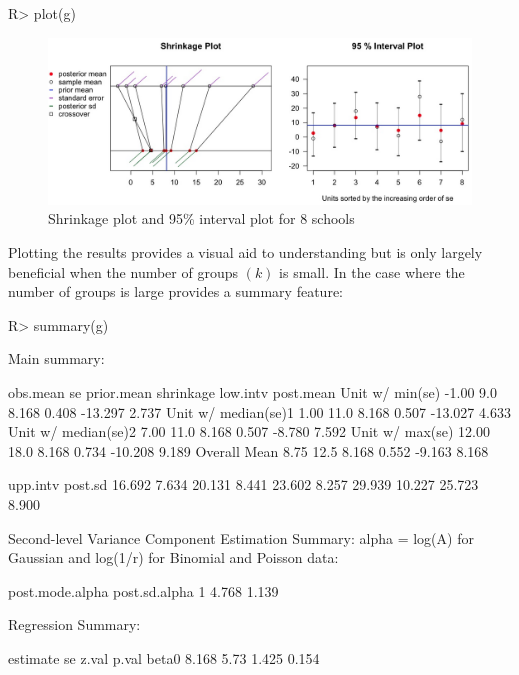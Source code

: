 \documentclass[article]{jss}
\begin{document}
\begin{CodeChunk}
\begin{CodeInput}
R> plot(g)
\end{CodeInput}
\end{CodeChunk}

\begin{figure}[h] \label{8schoolsplot}
\begin{center}
\includegraphics[scale=0.3]{school1.png}
\caption{Shrinkage plot and 95\% interval plot for 8 schools}
\end{center}
\end{figure}

Plotting the results provides a visual aid to understanding but is only largely beneficial when the number of groups $(k)$ is small. In the case where the number of groups is large  provides a summary feature:

\begin{CodeChunk}
\begin{CodeInput}
R> summary(g)
\end{CodeInput}
\begin{CodeOutput}
Main summary:

                    obs.mean   se prior.mean shrinkage low.intv post.mean
Unit w/ min(se)        -1.00  9.0      8.168     0.408  -13.297     2.737
Unit w/ median(se)1     1.00 11.0      8.168     0.507  -13.027     4.633
Unit w/ median(se)2     7.00 11.0      8.168     0.507   -8.780     7.592
Unit w/ max(se)        12.00 18.0      8.168     0.734  -10.208     9.189
Overall Mean            8.75 12.5      8.168     0.552   -9.163     8.168

                     upp.intv post.sd
                       16.692   7.634
                       20.131   8.441
                       23.602   8.257
                       29.939  10.227
                       25.723   8.900

Second-level Variance Component Estimation Summary:
alpha = log(A) for Gaussian and log(1/r) for Binomial and Poisson data:

  post.mode.alpha post.sd.alpha
1           4.768         1.139


Regression Summary:

      estimate   se z.val p.val
beta0    8.168 5.73 1.425 0.154
\end{CodeOutput}
\end{CodeChunk}
\end{document}
